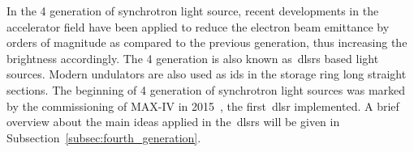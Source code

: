 In the 4 generation of synchrotron light source, recent developments in the accelerator field have been applied to reduce the electron beam emittance by orders of magnitude as compared to the previous generation, thus increasing the brightness accordingly. The 4 generation is also known as~\glspl{dlsr} based light sources. Modern undulators are also used as \glspl{id} in the storage ring long straight sections. The beginning of 4 generation of synchrotron light sources was marked by the commissioning of MAX-IV in 2015~\cite{eriksson2016}, the first~\gls{dlsr} implemented. A brief overview about the main ideas applied in the~\glspl{dlsr} will be given in Subsection~\ref{subsec:fourth_generation}.
